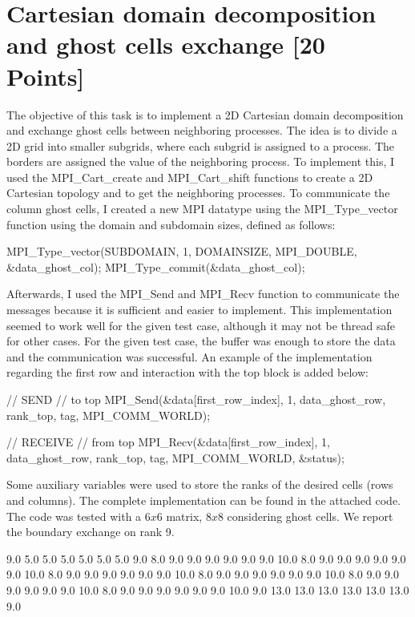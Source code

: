 \documentclass[unicode,11pt,a4paper,oneside,numbers=endperiod,openany]{scrartcl}
\begin{document}
\section{Cartesian domain decomposition and ghost cells exchange [20 Points]}
The objective of this task is to implement a 2D Cartesian domain decomposition
and exchange ghost cells between neighboring processes. The idea is to divide a
2D grid into smaller subgrids, where each subgrid is assigned to a process. The
borders are assigned the value of the neighboring process. 
To implement this, I used the MPI\_Cart\_create and MPI\_Cart\_shift functions
to create a 2D Cartesian topology and to get the neighboring processes.
To communicate the column ghost cells, I created a new MPI datatype using the
MPI\_Type\_vector function using the domain and subdomain sizes, defined as follows:
\begin{cppverbatim}
MPI_Type_vector(SUBDOMAIN, 1, DOMAINSIZE, MPI_DOUBLE, &data_ghost_col);
MPI_Type_commit(&data_ghost_col);
\end{cppverbatim}
Afterwards, I used the MPI\_Send and MPI\_Recv function to communicate the
messages because it is sufficient and easier to implement. This implementation seemed to work well for the given test case,
although it may not be thread safe for other cases. For the given test case, the
buffer was enough to store the data and the communication was successful.
An example of the implementation regarding the first row and interaction with
the top block is added below:
\begin{cppverbatim}
// SEND
//  to top
MPI_Send(&data[first_row_index], 1, data_ghost_row, rank_top, tag, MPI_COMM_WORLD);

// RECEIVE
// from top
MPI_Recv(&data[first_row_index], 1, data_ghost_row, rank_top, tag, MPI_COMM_WORLD, &status);
\end{cppverbatim}
Some auxiliary variables were used to store the ranks of the desired cells (rows
and columns).
The complete implementation can be found in the attached code. The code was
tested with a $6x6$ matrix, $8x8$ considering ghost cells. We report the boundary exchange on rank 9.
\begin{grayverbatim}
9.0  5.0  5.0  5.0  5.0  5.0  5.0 9.0
8.0  9.0  9.0  9.0  9.0  9.0  9.0 10.0
8.0  9.0  9.0  9.0  9.0  9.0  9.0 10.0
8.0  9.0  9.0  9.0  9.0  9.0  9.0 10.0
8.0  9.0  9.0  9.0  9.0  9.0  9.0 10.0
8.0  9.0  9.0  9.0  9.0  9.0  9.0 10.0
8.0  9.0  9.0  9.0  9.0  9.0  9.0 10.0
9.0 13.0 13.0 13.0 13.0 13.0 13.0 9.0
\end{grayverbatim}
\end{document}
